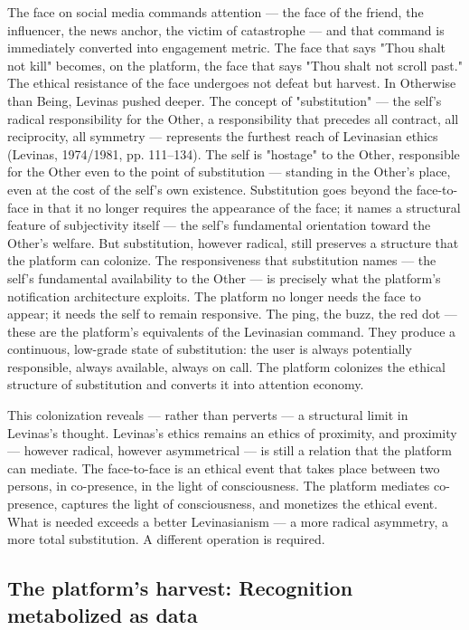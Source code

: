 The face on social media commands attention — the face of the friend, the influencer, the news anchor, the victim of catastrophe — and that command is immediately converted into engagement metric. The face that says "Thou shalt not kill" becomes, on the platform, the face that says "Thou shalt not scroll past." The ethical resistance of the face undergoes not defeat but harvest. In Otherwise than Being, Levinas pushed deeper. The concept of "substitution" — the self's radical responsibility for the Other, a responsibility that precedes all contract, all reciprocity, all symmetry — represents the furthest reach of Levinasian ethics (Levinas, 1974/1981, pp. 111–134). The self is "hostage" to the Other, responsible for the Other even to the point of substitution — standing in the Other's place, even at the cost of the self's own existence. Substitution goes beyond the face-to-face in that it no longer requires the appearance of the face; it names a structural feature of subjectivity itself — the self's fundamental orientation toward the Other's welfare. But substitution, however radical, still preserves a structure that the platform can colonize. The responsiveness that substitution names — the self's fundamental availability to the Other — is precisely what the platform's notification architecture exploits. The platform no longer needs the face to appear; it needs the self to remain responsive. The ping, the buzz, the red dot — these are the platform's equivalents of the Levinasian command. They produce a continuous, low-grade state of substitution: the user is always potentially responsible, always available, always on call. The platform colonizes the ethical structure of substitution and converts it into attention economy.

This colonization reveals — rather than perverts — a structural limit in Levinas's thought. Levinas's ethics remains an ethics of proximity, and proximity — however radical, however asymmetrical — is still a relation that the platform can mediate. The face-to-face is an ethical event that takes place between two persons, in co-presence, in the light of consciousness. The platform mediates co-presence, captures the light of consciousness, and monetizes the ethical event. What is needed exceeds a better Levinasianism — a more radical asymmetry, a more total substitution. A different operation is required.

\subsection{The platform's harvest: Recognition metabolized as data}

